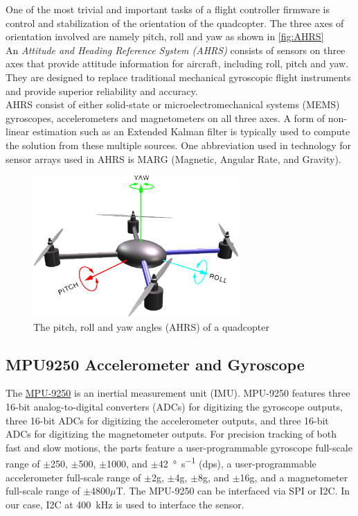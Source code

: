 \documentclass[a4paper,12pt,oneside]{book}
\begin{document}
One of the most trivial and important tasks of a flight controller firmware is control and stabilization of the orientation of the quadcopter. The three axes of orientation involved are namely pitch, roll and yaw as shown in \autoref{fig:AHRS}\\

An \textit{Attitude and Heading Reference System (AHRS)} consists of sensors on three axes that provide attitude information for aircraft, including roll, pitch and yaw. They are designed to replace traditional mechanical gyroscopic flight instruments and provide superior reliability and accuracy.\cite{ahrswiki}\\

AHRS consist of either solid-state or microelectromechanical systems (MEMS) gyroscopes, accelerometers and magnetometers on all three axes. A form of non-linear estimation such as an Extended Kalman filter is typically used to compute the solution from these multiple sources. One abbreviation used in technology for sensor arrays used in AHRS is MARG (Magnetic, Angular Rate, and Gravity).\cite{ahrswiki}\\

\begin{figure}[!htb]
\centering
\includegraphics[width=0.7\textwidth]{images/AHRS}
\caption{The pitch, roll and yaw angles (AHRS) of a quadcopter\cite{ardu}}
\label{fig:AHRS}
\end{figure}

\subsection{MPU9250 Accelerometer and Gyroscope}
The \href{./datasheets/MPU9250 Datasheet.pdf}{MPU-9250} is an inertial measurement unit (IMU). MPU-9250 features three 16-bit analog-to-digital converters (ADCs) for digitizing the gyroscope outputs, three 16-bit ADCs for digitizing the accelerometer outputs, and three 16-bit ADCs for digitizing the magnetometer outputs. For precision tracking of both fast and slow motions, the parts feature a user-programmable gyroscope full-scale range of $\pm$250, $\pm$500, $\pm$1000, and $\pm$\SI{42}{\degree\per\second} (dps), a user-programmable accelerometer full-scale range of $\pm$2g, $\pm$4g, $\pm$8g, and $\pm$16g, and a magnetometer full-scale range of $\pm$4800$\mu$T. The MPU-9250 can be interfaced via SPI or I2C. In our case, I2C at \SI{400}{\kilo\hertz} is used to interface the sensor.\\
\end{document}
